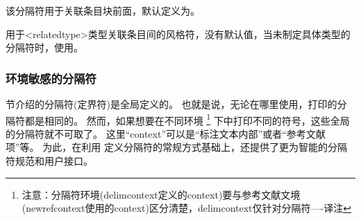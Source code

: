 \begin{ltxsyntax}
该分隔符用于关联条目块前面，默认定义为。

用于<relatedtype>类型关联条目间的风格符，没有默认值，当未制定具体类型的分隔符时，使用。

\end{ltxsyntax}

\subsubsection{环境敏感的分隔符}%
\label{use:fmt:csd}
 节介绍的分隔符(定界符)是全局定义的。
也就是说，无论在哪里使用，打印的分隔符都是相同的。
然而，如果想要在不同环境
\footnote{注意：分隔符环境(delimcontext定义的context)要与参考文献文境(newrefcontext使用的context)区分清楚，delimcontext仅针对分隔符----译注}
下中打印不同的符号，这些全局的分隔符就不可取了。
这里“context”可以是“标注文本内部”或者“参考文献项”等。
为此，\biblatex 在利用 定义分隔符的常规方式基础上，还提供了更为智能的分隔符规范和用户接口。

